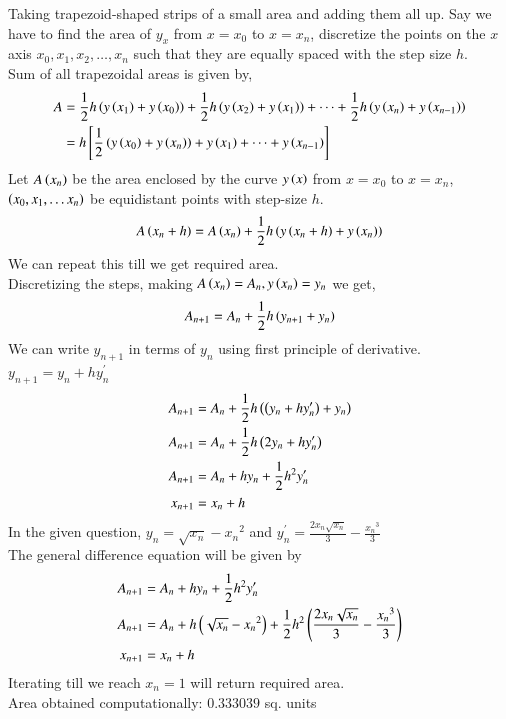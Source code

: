 \documentclass[journal]{IEEEtran}
\begin{document}
Taking trapezoid-shaped strips of a small area and adding them all up. Say we have to find the area of $y_{x}$ from $x=x_0$ to $x=x_n$, discretize the points on the $x$ axis $x_0, x_1, x_2, \dots, x_n$ such that they are equally spaced with the step size $h$. \\
Sum of all trapezoidal areas is given by,
\begin{align}
  A&=\frac{1}{2}h\left(y\left(x_1\right)+y\left(x_0\right)\right)+ \frac{1}{2}h\left(y\left(x_2\right)+y\left(x_1\right)\right)+\dots+\frac{1}{2}h\left(y\left(x_n\right)+y\left(x_{n-1}\right)\right)\\
  &=h{}\left[\frac{1}{2}\left(y\left(x_0\right)+y\left(x_n\right)\right)+ y\left(x_1\right)+\dots+y\left(x_{n-1}\right)\right]
\end{align}
Let $A\left(x_n\right)$ be the area enclosed by the curve $y\left(x\right)$ from $x=x_0$ to $x=x_n$, $\left(x_0, x_1, \dots x_n\right)$ be equidistant points with step-size $h$.
\begin{align}
  A\left(x_n+h\right)=A\left(x_n\right)+\frac{1}{2}h\left(y\left(x_n+h\right)+y\left(x_n\right)\right)
\end{align}
We can repeat this till we get required area.\\
Discretizing the steps, making $A\left(x_n\right)=A_n, y\left(x_n\right)=y_n$ we get,
\begin{align}
 A_{n+1}=A_n+\frac{1}{2}h\left(y_{n+1}+y_n\right)
\end{align}
We can write $y_{n+1}$ in terms of $y_n$ using first principle of derivative. $y_{n+1}=y_n+hy^{\prime}_n$
\begin{align}
  A_{n+1}&=A_n+\frac{1}{2}h\left(\left(y_{n}+hy^{\prime}_n\right)+y_n\right)\\
  A_{n+1}&=A_n+\frac{1}{2}h\left(2y_n+hy^{\prime}_n\right)\\
  A_{n+1}&=A_n+hy_n+\frac{1}{2}h^2y^{\prime}_n\\
  x_{n+1}&=x_n+h
\end{align}
In the given question, $y_n=\sqrt{x_n} - {x_n}^2$ and $y^{\prime}_n= \frac{2 x_n \sqrt{x_n}}{3}-\frac{{x_n}^3}{3} $\\
The general difference equation will be given by
\begin{align}
  A_{n+1}&=A_n+hy_n+\frac{1}{2}h^2y^{\prime}_n\\
  A_{n+1}&=A_n+h\left(\sqrt{x_n} - {x_n}^2\right)+\frac{1}{2}h^2\left(\frac{2 x_n \sqrt{x_n}}{3}-\frac{{x_n}^3}{3}\right)\\
  x_{n+1}&=x_n+h
\end{align}
Iterating till we reach $x_n=1$ will return required area. \\
Area obtained computationally: $0.333039$ sq. units\\
\end{document}
